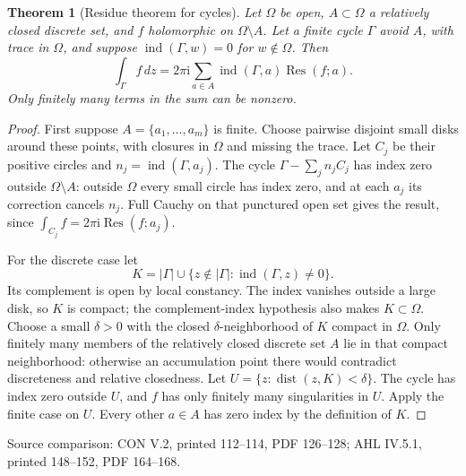 \documentclass[11pt,a4paper,openany]{book}
\newtheorem{theorem}{Theorem}[chapter]
\theoremstyle{definition}
\theoremstyle{remark}\newtheorem{remark}[theorem]{Remark}
\newcommand{\dd}{\,d}\newcommand{\iu}{\mathrm i}
\DeclareMathOperator{\Res}{Res}\DeclareMathOperator{\ind}{ind}
\DeclareMathOperator{\dist}{dist}\DeclareMathOperator{\ord}{ord}
\newcommand{\family}[1]{}
\newcommand{\source}[1]{\par\begingroup\small\sffamily\color{black!65}Source comparison: #1\par\endgroup}
\begin{document}
\begin{theorem}[Residue theorem for cycles]\family{D12.08.02}\label{d12:08-02}
Let \(\Omega\) be open, \(A\subset\Omega\) a relatively closed discrete
set, and \(f\) holomorphic on \(\Omega\setminus A\).
Let a finite cycle \(\Gamma\) avoid \(A\), with trace in \(\Omega\),
and suppose \(\ind(\Gamma,w)=0\) for \(w\notin\Omega\).
Then
\[
 \int_\Gamma f\dd z
   =2\pi\iu\sum_{a\in A}\ind(\Gamma,a)\Res(f;a).
\]
Only finitely many terms in the sum can be nonzero.
\end{theorem}
\begin{proof}
First suppose \(A=\{a_1,\ldots,a_m\}\) is finite.
Choose pairwise disjoint small disks around these points, with closures
in \(\Omega\) and missing the trace. Let \(C_j\) be their positive
circles and \(n_j=\ind(\Gamma,a_j)\).
The cycle \(\Gamma-\sum_jn_jC_j\) has index zero outside
\(\Omega\setminus A\): outside \(\Omega\) every small circle has
index zero, and at each \(a_j\) its correction cancels \(n_j\).
Full Cauchy on that punctured open set gives the result, since
\(\int_{C_j}f=2\pi\iu\Res(f;a_j)\).

For the discrete case let
\[
 K=|\Gamma|\cup
   \{z\notin|\Gamma|:\ind(\Gamma,z)\ne0\}.
\]
Its complement is open by local constancy. The index vanishes outside
a large disk, so \(K\) is compact; the complement-index hypothesis
also makes \(K\subset\Omega\).
Choose a small \(\delta>0\) with the closed \(\delta\)-neighborhood
of \(K\) compact in \(\Omega\).
Only finitely many members of the relatively closed discrete set \(A\)
lie in that compact neighborhood: otherwise an accumulation point
there would contradict discreteness and relative closedness.
Let \(U=\{z:\dist(z,K)<\delta\}\).
The cycle has index zero outside \(U\), and \(f\) has only finitely
many singularities in \(U\). Apply the finite case on \(U\).
Every other \(a\in A\) has zero index by the definition of \(K\).
\end{proof}
\source{CON V.2, printed 112--114, PDF 126--128; AHL IV.5.1, printed 148--152, PDF 164--168.}
\end{document}
